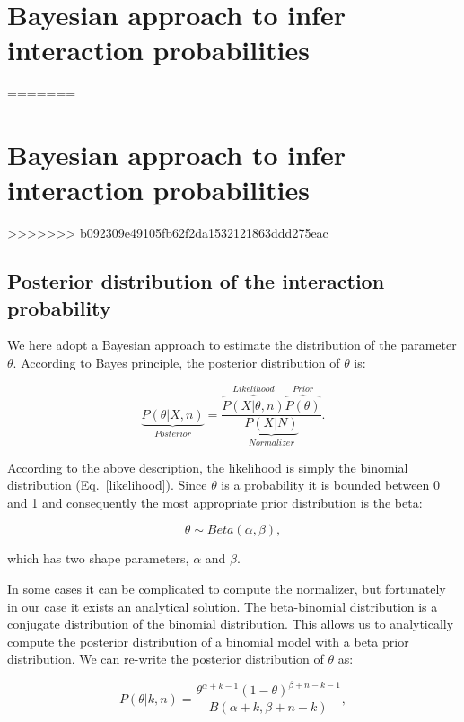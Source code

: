\documentclass[12pt]{article}
\begin{document}
\section*{Bayesian approach to infer interaction probabilities}
=======
 \section*{Bayesian approach to infer interaction probabilities}
>>>>>>> b092309e49105fb62f2da1532121863ddd275eac

    \subsection*{Posterior distribution of the interaction probability}

  We here adopt a Bayesian approach to estimate the distribution of the parameter $\theta$. According to Bayes principle, the posterior distribution of $\theta$ is:

  \begin{equation}
    \underbrace{P(\theta|X,n)}_{Posterior} = \frac{\overbrace{P(X|\theta,n)}^{Likelihood}\overbrace{P(\theta)}^{Prior}}{\underbrace{P(X|N)}_{Normalizer}} .
    \label{posterior}
  \end{equation}

  According to the above description, the likelihood is simply the binomial distribution (Eq.~\ref{likelihood}). Since $\theta$ is a probability it is bounded between 0 and 1 and consequently the most appropriate prior distribution is the beta:

    \begin{equation}
      \theta \sim Beta(\alpha,\beta) , \label{prior}
    \end{equation}

  \noindent which has two shape parameters, $\alpha$ and $\beta$. 

 In some cases it can be complicated to compute the normalizer, but fortunately in our case it exists an analytical solution. The beta-binomial distribution is a conjugate distribution of the binomial distribution. This allows us to analytically compute the posterior distribution of a binomial model with a beta prior distribution. We can re-write the posterior distribution of $\theta$ as:

  \begin{equation}
    P(\theta|k,n) = \frac{\theta^{\alpha+k-1}(1-\theta)^{\beta+n-k-1}}{B(\alpha+k,\beta+n-k)} , \label{posterior}
  \end{equation}
\end{document}
